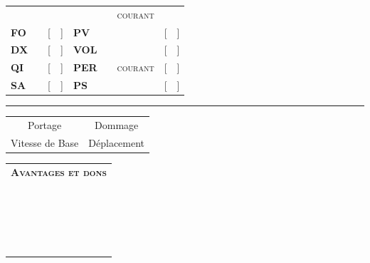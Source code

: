 \documentclass[11pt,twoside,a4paper]{article}
\def\smallbox{%
	\setlength{\unitlength}{0.5cm}
	\fbox{
		\begin{picture}(1, 1)(0,0)
		\end{picture}
	}
}%
\def\FRdefCourant{{\footnotesize \textsc{courant}}}
\def\FRdefFO{FO}	%
\def\FRdefDX{DX}	%
\def\FRdefQI{QI}	%
\def\FRdefSA{SA}	%
\def\FRdefPV{PV}	%
\def\FRdefVOL{VOL}	%
\def\FRdefPER{PER}	%
\def\FRdefPS{PS}	%
\def\FRdefBasePortage{Portage  \dotfill }
\def\FRdefBaseVitesse{Vitesse de Base \dotfill  [~~]}
\def\FRdefBaseMove{D{\'e}placement \dotfill  [~~]}
\def\FRdefDommage{Dommage \dotfill }
\def\FRdefAvantagesEtDons{Avantages et dons}
\begin{document}
\begin{multicols}{2}
	\begin{tabular}[c]{p{1.25cm} c c p{1.25cm} c c c}
							&				&			&						&				&	\FRdefCourant	&			\\
		\textbf{\FRdefFO}	&	\smallbox	&	[~~]	&	\textbf{\FRdefPV}	&	\smallbox	&	\smallbox		&	[~~]	\\
		\textbf{\FRdefDX}	&	\smallbox	&	[~~]	&	\textbf{\FRdefVOL}	&	\smallbox	&					&	[~~]	\\
		\textbf{\FRdefQI}	&	\smallbox	&	[~~]	&	\textbf{\FRdefPER}	&	\smallbox	&	\FRdefCourant	&	[~~]	\\
		\textbf{\FRdefSA}	&	\smallbox	&	[~~]	&	\textbf{\FRdefPS}	&	\smallbox	&	\smallbox		&	[~~]	\\
	\end{tabular}
	
	\rule{10cm}{1pt}
	
	\begin{tabular}[c]{c c}
		\FRdefBasePortage & \FRdefDommage \\
		\FRdefBaseVitesse & \FRdefBaseMove \\
	\end{tabular}
	
	\begin{tabular}[c]{|p{9.5cm}|}
		\hline
		\textbf{\textsc{\FRdefAvantagesEtDons}} \\ 
		\dotfill [~~]	\\ 
		\dotfill [~~]	\\ 
		\dotfill [~~]	\\ 
		\dotfill [~~]	\\ 
		\dotfill [~~]	\\ 
		\dotfill [~~]	\\ 
		\dotfill [~~]	\\
		\dotfill [~~]	\\ 
		\dotfill [~~]	\\ 
		\dotfill [~~]	\\ 
		\dotfill [~~]	\\ 
		\dotfill [~~]	\\ 
		\dotfill [~~]	\\ 
		\dotfill [~~]	\\ 
		\dotfill [~~]	\\ 
		\dotfill [~~]	\\ 
		\dotfill [~~]	\\ 
		\dotfill [~~]	\\ 
		\dotfill [~~]	\\ 
		\dotfill [~~]	\\ 
		

\end{tabular}
\end{multicols}
\end{document}

